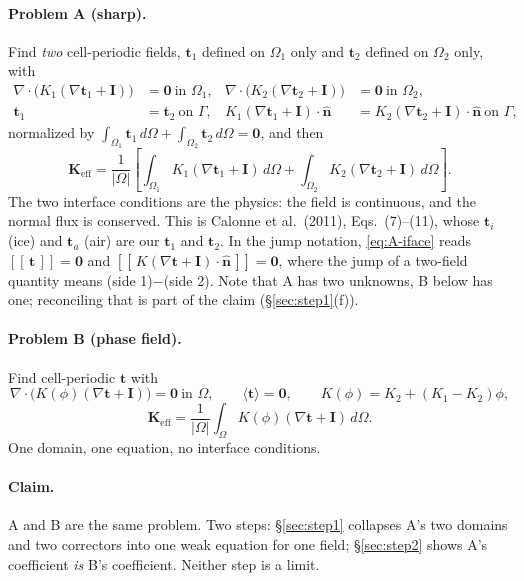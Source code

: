 \documentclass[11pt]{article}
\newcommand{\Om}{\Omega}
\newcommand{\Gam}{\Gamma}
\newcommand{\bn}{\hat{\mathbf n}}
\newcommand{\bt}{\mathbf t}
\newcommand{\bI}{\mathbf I}
\newcommand{\Keff}{\mathbf{K}_{\mathrm{eff}}}
\newcommand{\jump}[1]{[\![\,#1\,]\!]}
\newcommand{\avg}[1]{\big\langle #1 \big\rangle}
\begin{document}
\paragraph{Problem A (sharp).} Find \emph{two} cell-periodic fields, $\bt_1$
defined on $\Om_1$ only and $\bt_2$ defined on $\Om_2$ only, with
\begin{align}
\nabla\!\cdot\!\big(K_1(\nabla\bt_1+\bI)\big)&=\mathbf 0 \ \text{in }\Om_1, &
\nabla\!\cdot\!\big(K_2(\nabla\bt_2+\bI)\big)&=\mathbf 0 \ \text{in }\Om_2,
\label{eq:A-bulk}\\
\bt_1&=\bt_2 \ \text{on }\Gam, &
K_1(\nabla\bt_1+\bI)\!\cdot\!\bn&=K_2(\nabla\bt_2+\bI)\!\cdot\!\bn \ \text{on }\Gam,
\label{eq:A-iface}
\end{align}
normalized by
$\int_{\Om_1}\bt_1\,d\Om+\int_{\Om_2}\bt_2\,d\Om=\mathbf 0$, and then
\begin{equation}
\Keff=\frac{1}{|\Om|}\left[\int_{\Om_1}\!K_1(\nabla\bt_1+\bI)\,d\Om
                          +\int_{\Om_2}\!K_2(\nabla\bt_2+\bI)\,d\Om\right].
\label{eq:A-keff}
\end{equation}
The two interface conditions are the physics: the field is continuous, and the
normal flux is conserved. This is Calonne et al.\ (2011), Eqs.~(7)--(11), whose
$\bt_i$ (ice) and $\bt_a$ (air) are our $\bt_1$ and $\bt_2$. In the jump
notation, \eqref{eq:A-iface} reads $\jump{\bt}=\mathbf 0$ and
$\jump{K(\nabla\bt+\bI)\!\cdot\!\bn}=\mathbf 0$, where the jump of a
two-field quantity means (side 1)$-$(side 2).
Note that A has two unknowns, B below has one; reconciling that is part of the
claim (\S\ref{sec:step1}(f)).

\paragraph{Problem B (phase field).} Find cell-periodic $\bt$ with
\begin{equation}
\nabla\!\cdot\!\big(K(\phi)(\nabla\bt+\bI)\big)=\mathbf 0 \ \text{in }\Om,
\qquad \avg{\bt}=\mathbf 0,
\qquad K(\phi)=K_2+(K_1-K_2)\phi,
\label{eq:B}
\end{equation}
\begin{equation}
\Keff=\frac{1}{|\Om|}\int_{\Om} K(\phi)(\nabla\bt+\bI)\,d\Om .
\label{eq:B-keff}
\end{equation}
One domain, one equation, no interface conditions.

\paragraph{Claim.} A and B are the same problem. Two steps:
\S\ref{sec:step1} collapses A's two domains and two correctors into one weak
equation for one field;
\S\ref{sec:step2} shows A's coefficient \emph{is} B's coefficient. Neither step
is a limit.
\end{document}
